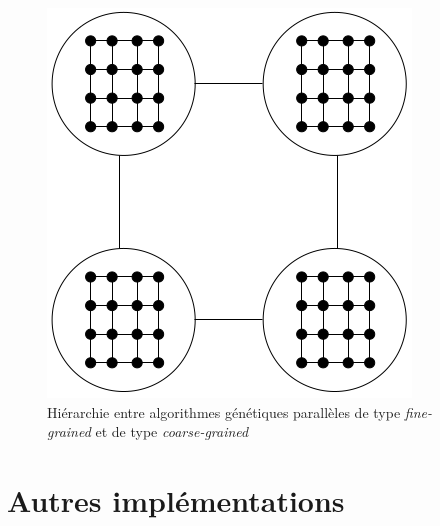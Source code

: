 \documentclass[12pt,a4paper]{article}
\begin{document}
	\begin{figure}[!h]
		\begin{center}
			\includegraphics[scale=.3]{img/hierar_fine_grained_fig.png}
			\caption{Hiérarchie entre algorithmes génétiques parallèles de type \emph{fine-grained} et de type \emph{coarse-grained}}
			\label{fig:hierar_fine_grained_fig}
		\end{center}
	\end{figure} 
	\section{Autres implémentations}
\end{document}

